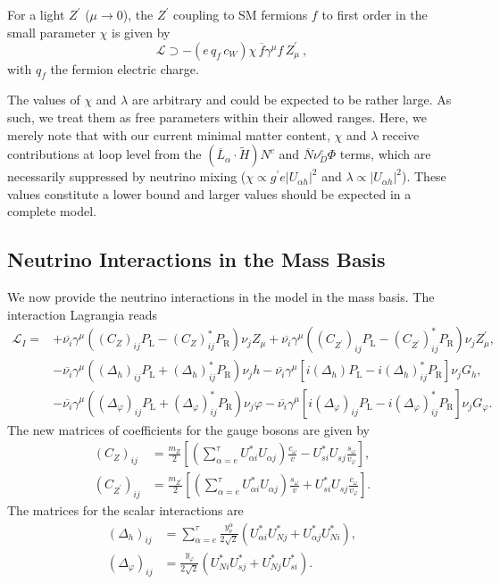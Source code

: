 For a light $Z^\prime$ ($\mu\to0$), the $Z^\prime$ coupling to SM fermions $f$ to first order in the small parameter $\chi$ is given by
%
\begin{equation}
\mathscr{L} \supset - (e\,q_f\,c_{W}) \chi \,\overline{f} \gamma^\mu f\,Z^\prime_\mu ~,
\end{equation}
%
with  $q_f$ the fermion electric charge.


The values of $\chi$ and $\lambda$ are arbitrary and could be expected to be rather large. As such, we treat them as free parameters within their allowed ranges. Here, we merely note that with our current minimal matter content, $\chi$ and $\lambda$ receive contributions at loop level from the $(\overline{L}_\alpha \cdot \widetilde{H})N^c$ and $\overline{N} \nu_D^c \Phi$ terms, which are necessarily suppressed by neutrino mixing ($\chi \propto g^\prime e |U_{\alpha h}|^2$ and $\lambda \propto |U_{\alpha h}|^2$). These values constitute a lower bound and larger values should be expected in a complete model.

\subsection{Neutrino Interactions in the Mass Basis}

We now provide the neutrino interactions in the model in the mass basis. The interaction Lagrangia reads
%
\begin{align}
%
\mathcal{L}_I = &+ \overline{\nu_i}\gamma^\mu\left((C_Z)_{ij}P_\text{L} - (C_Z)^*_{ij}P_\text{R}\right)\nu_j Z_\mu + \overline{\nu_i}\gamma^\mu\left((C_{Z^\prime})_{ij} P_\text{L} - (C_{Z^\prime})^*_{ij}P_\text{R}\right)\nu_j Z^\prime_\mu, \\
%
&- \overline{\nu_i}\gamma^\mu\left((\Delta_h)_{ij}P_\text{L} + (\Delta_h)^*_{ij} P_\text{R}\right)\nu_j h - \overline{\nu_i}\gamma^\mu\left[i(\Delta_h)P_\text{L} - i(\Delta_h)^*_{ij} P_\text{R}\right]\nu_j G_h, \\
%
&- \overline{\nu_i}\gamma^\mu\left((\Delta_\varphi)_{ij}P_\text{L} + (\Delta_\varphi)^*_{ij}P_\text{R}\right)\nu_j \varphi - \overline{\nu_i}\gamma^\mu\left[i(\Delta_\varphi)_{ij}P_\text{L} - i(\Delta_\varphi)^*_{ij} P_\text{R}\right]\nu_j G_\varphi.
%
\end{align}
%
The new matrices of coefficients for the gauge bosons are given by
%
\begin{align}
%
(C_Z)_{ij} &= \frac{m_Z}{2}\left[\left(\sum_{\alpha =e}^\tau U^*_{\alpha i}U_{\alpha j}\right)\frac{c_\omega }{v} - U^*_{si}U_{sj}\frac{s_\omega}{v_\varphi}\right], \\
(C_{Z^\prime})_{ij} &=\frac{m_{Z^\prime}}{2} \left[\left(\sum_{\alpha =e}^\tau U^*_{\alpha i}U_{\alpha j}\right)\frac{s_\omega}{v} + U^*_{si}U_{sj}\frac{c_\omega}{v_\varphi}\right].
\end{align}
%
The matrices for the scalar interactions are 
%
%
\begin{align}
%
(\Delta_h)_{ij} &=\sum_{\alpha=e}^\tau \frac{y^\alpha_\nu}{2\sqrt{2}}\left(U_{\alpha i}^*U_{Nj}^* + U_{\alpha j}^*U_{Ni}^*\right),\\
%
(\Delta_\varphi)_{ij} &= \frac{y_\varphi}{2\sqrt{2}}\left(U_{N i}^*U_{sj}^* + U_{N j}^*U_{si}^*\right).
%
\end{align}

